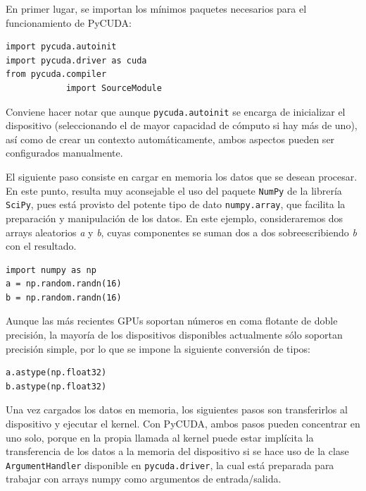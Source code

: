 \documentclass[twocolumn,twoside]{Jornadas}
\begin{document}

En primer lugar, se importan los mínimos paquetes necesarios para el funcionamiento de PyCUDA:

\begin{lstlisting}
import pycuda.autoinit
import pycuda.driver as cuda
from pycuda.compiler 
            import SourceModule
\end{lstlisting}

Conviene hacer notar que aunque {\tt pycuda.autoinit} se encarga de inicializar el dispositivo (seleccionando el de mayor capacidad de cómputo si hay más de uno), así como de crear un contexto automáticamente, ambos aspectos pueden ser configurados manualmente.


El siguiente paso consiste en cargar en memoria los datos que se desean procesar. En este punto, resulta muy aconsejable el uso del paquete {\tt NumPy} de la librería {\tt SciPy}, pues está provisto del potente tipo de dato {\tt numpy.array}, que facilita la preparación y manipulación de los datos. En este ejemplo, consideraremos dos arrays aleatorios \emph{a} y \emph{b}, cuyas componentes se suman dos a dos sobreescribiendo \emph{b} con el resultado.


\begin{lstlisting}
import numpy as np
a = np.random.randn(16)
b = np.random.randn(16)
\end{lstlisting}

Aunque las más recientes GPUs soportan números en coma flotante de doble precisión, la mayoría de los dispositivos disponibles actualmente sólo soportan precisión simple, por lo que se impone la siguiente conversión de tipos:

\begin{lstlisting}
a.astype(np.float32)
b.astype(np.float32)
\end{lstlisting}

Una vez cargados los datos en memoria, los siguientes pasos son transferirlos al dispositivo y ejecutar el kernel. Con PyCUDA, ambos pasos pueden concentrar en uno solo, porque en la propia llamada al kernel puede estar implícita la transferencia de los datos a la memoria del dispositivo si se hace uso de la clase {\tt ArgumentHandler} disponible en {\tt pycuda.driver}, la cual está preparada para trabajar con arrays numpy como argumentos de entrada/salida.
\end{document}
